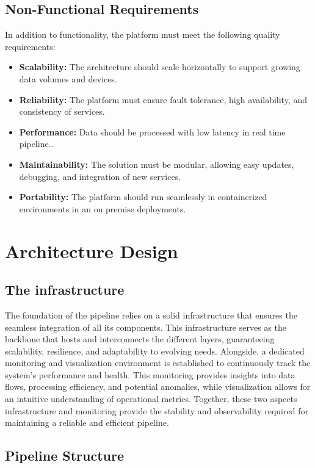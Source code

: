\subsection{Non-Functional Requirements}
In addition to functionality, the platform must meet the following quality requirements:
\begin{itemize}
\item \textbf{Scalability:} The architecture should scale horizontally to support growing data volumes and devices.
\item \textbf{Reliability:} The platform must ensure fault tolerance, high availability, and consistency of services.
\item \textbf{Performance:} Data should be processed with low latency in real time pipeline..
\item \textbf{Maintainability:} The solution must be modular, allowing easy updates, debugging, and integration of new services.
\item \textbf{Portability:} The platform should run seamlessly in containerized environments in an on premise deployments.
\end{itemize}

\section{Architecture Design} 
\subsection{The infrastructure}
The foundation of the pipeline relies on a solid infrastructure that ensures the seamless integration of all its components. This infrastructure serves as the backbone that hosts and interconnects the different layers, guaranteeing scalability, resilience, and adaptability to evolving needs. Alongside, a dedicated monitoring and visualization environment is established to continuously track the system’s performance and health. This monitoring provides insights into data flows, processing efficiency, and potential anomalies, while visualization allows for an intuitive understanding of operational metrics. Together, these two aspects infrastructure and monitoring provide the stability and observability required for maintaining a reliable and efficient pipeline. 

\subsection{Pipeline Structure}

